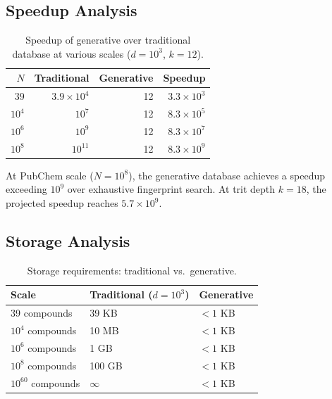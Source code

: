 \subsection{Speedup Analysis}
\label{sec:ch23-speedup}

\begin{table}[htbp]
\centering
\caption{Speedup of generative over traditional database at various scales
         ($d = 10^3$, $k = 12$).}
\label{tab:ch23-speedup}
\begin{tabular}{@{}rrrr@{}}
\toprule
$N$ & \textbf{Traditional} & \textbf{Generative} & \textbf{Speedup} \\
\midrule
$39$     & $3.9 \times 10^{4}$  & 12 & $3.3 \times 10^{3}$ \\
$10^4$   & $10^{7}$             & 12 & $8.3 \times 10^{5}$ \\
$10^6$   & $10^{9}$             & 12 & $8.3 \times 10^{7}$ \\
$10^8$   & $10^{11}$            & 12 & $8.3 \times 10^{9}$ \\
\bottomrule
\end{tabular}
\end{table}

At PubChem scale ($N = 10^8$), the generative database achieves a speedup
exceeding $10^9$ over exhaustive fingerprint search.  At trit depth $k = 18$,
the projected speedup reaches $5.7 \times 10^9$.

\subsection{Storage Analysis}
\label{sec:ch23-storage}

\begin{table}[htbp]
\centering
\caption{Storage requirements: traditional vs.\ generative.}
\label{tab:ch23-storage}
\begin{tabular}{@{}lll@{}}
\toprule
\textbf{Scale} & \textbf{Traditional ($d = 10^3$)} & \textbf{Generative} \\
\midrule
39 compounds       & 39 KB            & $< 1$ KB \\
$10^4$ compounds   & 10 MB            & $< 1$ KB \\
$10^6$ compounds   & 1 GB             & $< 1$ KB \\
$10^8$ compounds   & 100 GB           & $< 1$ KB \\
$10^{60}$ compounds & $\infty$        & $< 1$ KB \\
\bottomrule
\end{tabular}
\end{table}

